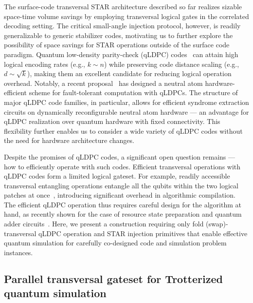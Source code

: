 \documentclass[aps, prx, reprint, superscriptaddress, longbibliography, floatfix]{revtex4-2}
\begin{document}
The surface-code transversal STAR architecture described so far realizes sizable space-time volume savings by employing transversal logical gates in the correlated decoding setting. The critical small-angle injection protocol, however, is readily generalizable to generic stabilizer codes, motivating us to further explore the possibility of space savings for STAR operations outside of the surface code paradigm. Quantum low-density parity-check (qLDPC) codes~\cite{Kovalev2013, Breuckmann2021, Lawrence2022, Quintavalle2023, Bravyi2024, Xu2024} can attain high logical encoding rates (e.g., $k\sim n$) while preserving code distance scaling (e.g., $d\sim \sqrt{k}$), making them an excellent candidate for reducing logical operation overhead. Notably, a recent proposal~\cite{Xu2024} has designed a neutral atom hardware-efficient scheme for fault-tolerant computation with qLDPCs. The structure of major qLDPC code families, in particular, allows for efficient syndrome extraction circuits on dynamically reconfigurable neutral atom hardware --- an advantage for qLDPC realization over quantum hardware with fixed connectivity. This flexibility further enables us to consider a wide variety of qLDPC codes without the need for hardware architecture changes. 

Despite the promises of qLDPC codes, a significant open question remains --- how to efficiently operate with such codes. Efficient transversal operations with qLDPC codes form a limited logical gateset. For example, readily accessible transversal entangling operations entangle all the qubits within the two logical patches at once~\cite{Breuckmann2024, eberhardt2024}, introducing significant overhead in algorithmic compilation. The efficient qLDPC operation thus requires careful design for the algorithm at hand, as recently shown for the case of resource state preparation and quantum adder circuits~\cite{Xu2025}. Here, we present a construction requiring only fold (swap)-transversal qLDPC operation and STAR injection primitives that enable effective quantum simulation for carefully co-designed code and simulation problem instances.


\subsection{Parallel transversal gateset for Trotterized quantum simulation}
\label{sec:qldpc_gateset}
\end{document}
